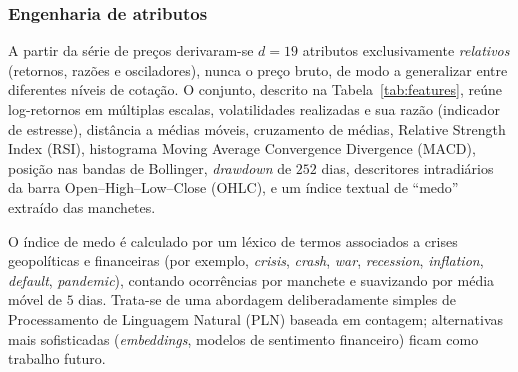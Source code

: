 \documentclass[12pt]{article}
\begin{document}
\subsubsection{Engenharia de atributos}
\label{sec:features}

A partir da série de preços derivaram-se $d = 19$ atributos exclusivamente
\emph{relativos} (retornos, razões e osciladores), nunca o preço bruto, de modo
a generalizar entre diferentes níveis de cotação. O conjunto, descrito na
Tabela~\ref{tab:features}, reúne log-retornos em múltiplas escalas,
volatilidades realizadas e sua razão (indicador de estresse), distância a
médias móveis, cruzamento de médias, Relative Strength Index (RSI), histograma Moving Average Convergence Divergence (MACD), posição nas bandas
de Bollinger, \emph{drawdown} de $252$ dias, descritores intradiários da barra
Open–High–Low–Close (OHLC), e um índice textual de ``medo'' extraído das manchetes.

O índice de medo é calculado por um léxico de termos associados a crises
geopolíticas e financeiras (por exemplo, \emph{crisis}, \emph{crash},
\emph{war}, \emph{recession}, \emph{inflation}, \emph{default},
\emph{pandemic}), contando ocorrências por manchete e suavizando por média
móvel de $5$ dias. Trata-se de uma abordagem deliberadamente simples de Processamento de Linguagem Natural (PLN)
baseada em contagem; alternativas mais sofisticadas (\emph{embeddings},
modelos de sentimento financeiro) ficam como trabalho futuro.
\end{document}
